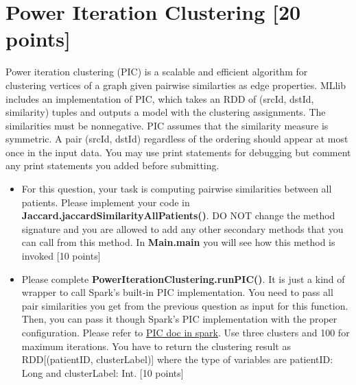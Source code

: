 \documentclass[12pt]{article}
\begin{document}
\section{Power Iteration Clustering [20 points]}
Power iteration clustering (PIC) is a scalable and efficient algorithm for clustering vertices of a graph given pairwise similarties as edge properties.  MLlib includes an implementation of PIC, which takes an RDD of (srcId, dstId, similarity) tuples and outputs a model with the clustering assignments. The similarities must be nonnegative. PIC assumes that the similarity measure is symmetric. A pair (srcId, dstId) regardless of the ordering should appear at most once in the input data. You may use print statements for debugging but comment any print statements you added before submitting.

\begin{itemize}
\item For this question, your task is computing pairwise similarities between all patients. Please implement your code in \textbf{Jaccard.jaccardSimilarityAllPatients()}. DO NOT change the method signature and you are allowed to add any other secondary methods that you can call from this method. In \textbf{Main.main} you will see how this method is invoked [10 points]
\item Please complete \textbf{PowerIterationClustering.runPIC()}. It is just a kind of wrapper to call Spark's built-in PIC implementation. You need to pass all pair similarities you get from the previous question as input for this function. Then, you can pass it though Spark's PIC implementation with the proper configuration. Please refer to \href{http://spark.apache.org/docs/2.3.0/mllib-clustering.html#power-iteration-clustering-pic}{PIC doc in spark}. Use three clusters and 100 for maximum iterations. You have to return the clustering result as RDD[(patientID, clusterLabel)] where the type of variables are patientID: Long and clusterLabel: Int.  [10 points]
\end{itemize}

\clearpage
\end{document}
